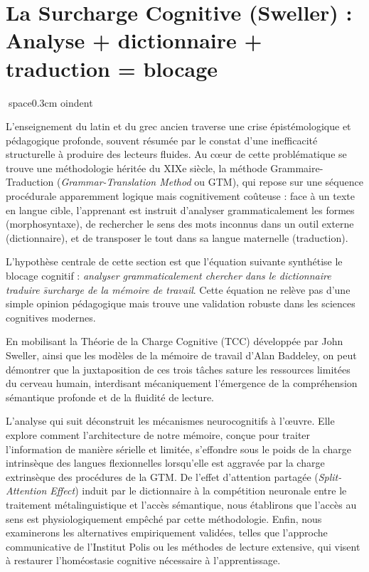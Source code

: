 

\section{La Surcharge Cognitive (Sweller) : Analyse + dictionnaire + traduction = blocage}
space{0.3cm}
oindent

L'enseignement du latin et du grec ancien traverse une crise épistémologique et pédagogique
profonde, souvent résumée par le constat d'une inefficacité structurelle à produire des lecteurs
fluides. Au cœur de cette problématique se trouve une méthodologie héritée du XIXe siècle, la
méthode Grammaire-Traduction (\textit{Grammar-Translation Method} ou GTM), qui repose sur une
séquence procédurale apparemment logique mais cognitivement coûteuse : face à un texte en langue
cible, l'apprenant est instruit d'analyser grammaticalement les formes (morphosyntaxe), de
rechercher le sens des mots inconnus dans un outil externe (dictionnaire), et de transposer le tout
dans sa langue maternelle (traduction).

L'hypothèse centrale de cette section est que l'équation suivante synthétise le blocage cognitif : \textit{analyser grammaticalement \+ chercher dans le dictionnaire \+ traduire \= surcharge de la mémoire de travail}. Cette équation ne relève pas d'une simple opinion pédagogique mais trouve une validation robuste dans les sciences cognitives modernes.

En mobilisant la Théorie de la Charge Cognitive (TCC) développée par John Sweller, ainsi que les modèles de la mémoire de travail d'Alan Baddeley, on peut démontrer que la juxtaposition de ces trois tâches sature les ressources limitées du cerveau humain, interdisant mécaniquement l'émergence de la compréhension sémantique profonde et de la fluidité de lecture.

L'analyse qui suit déconstruit les mécanismes neurocognitifs à l'œuvre. Elle explore comment
l'architecture de notre mémoire, conçue pour traiter l'information de manière sérielle et limitée,
s'effondre sous le poids de la charge intrinsèque des langues flexionnelles lorsqu'elle est aggravée
par la charge extrinsèque des procédures de la GTM. De l'effet d'attention partagée (\textit{Split-
Attention Effect}) induit par le dictionnaire à la compétition neuronale entre le traitement
métalinguistique et l'accès sémantique, nous établirons que l'accès au sens est physiologiquement
empêché par cette méthodologie. Enfin, nous examinerons les alternatives empiriquement validées,
telles que l'approche communicative de l'Institut Polis ou les méthodes de lecture extensive, qui
visent à restaurer l'homéostasie cognitive nécessaire à l'apprentissage.




